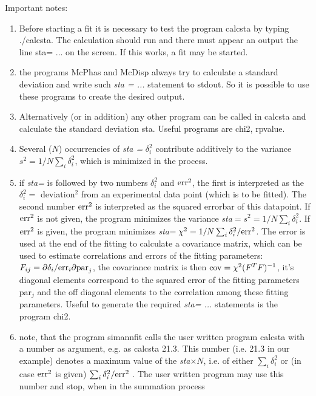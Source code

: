 Important notes:
\begin{enumerate}
\item
Before starting a fit it is necessary to test the program {\prg calcsta} by typing
{\prg ./calcsta}. The calculation should run and there must appear an output
the line {\prg sta= ...} on the screen. If this works, a fit may be started.
\item the programs {\prg McPhas} and {\prg McDisp} always try to
calculate a standard deviation and write such {\em sta = ...} statement
to stdout.  So it is possible to use these programs to create the desired output.
\item
 Alternatively (or in addition)
any other program can be called in {\prg calcsta} and calculate the 
standard deviation {\prg sta}. Useful  programs are {\prg chi2},
{\prg rpvalue}.
\item Several ($N$) occurrencies of {\em sta = } $\delta_i^2$  contribute additively to
the variance $s^2=1/N\sum_i \delta_i^2$, which is minimized in the process.
\item
if {\em sta=} is followed by two numbers $\delta_i^2$ and ${\rm err}^2$, the first is interpreted as the 
 $\delta_i^2=$ deviation$^2$ from an experimental data point (which is to be fitted).
The second number ${\rm err}^2$  is interpreted as the squared errorbar of this 
datapoint. If ${\rm err}^2$ is not given, the program minimizes the variance
{\em sta}$=s^2=1/N\sum_i \delta_i^2$.
If ${\rm err}^2$ is given, the program minimizes {\em sta}$=\chi^2=1/N\sum_i \delta_i^2/{\rm err}^2$.
The error is used at the end of the fitting to calculate
a covariance matrix, which can be used to estimate correlations
and errors of the fitting parameters: $F_{ij}=\partial \delta_i / {\rm err}_i\partial {\rm par}_j$,
the covariance matrix is then ${\rm cov}=\chi^2(F^TF)^{-1}$, it's diagonal elements correspond
to the squared error of the fitting parameters par$_j$ and the off diagonal elements to
the correlation among these fitting parameters.  Useful to generate
the required {\em sta= ...} statements is the program {\prg chi2}.
\item
 note, that the program {\prg simannfit} calls the user written program
{\prg calcsta} with a number as argument, e.g. as {\prg calcsta 21.3}. This number
(i.e. 21.3 in our example) denotes a maximum value of the {\em sta}$\times N$, i.e. of either
 $\sum_i \delta_i^2$ or (in case ${\rm err}^2$ is given)
$\sum_i \delta_i^2/{\rm err}^2$ . The
user written program may use this number and stop, when in the summation process

\end{enumerate}
